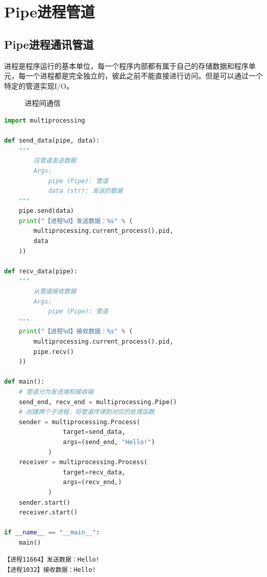 \newpage

\section{Pipe进程管道}

\subsection{Pipe进程通讯管道}

进程是程序运行的基本单位，每一个程序内部都有属于自己的存储数据和程序单元，每一个进程都是完全独立的，彼此之前不能直接进行访问。但是可以通过一个特定的管道实现I/O。

\begin{figure}[H]
	\centering
	\caption{进程间通信}
\end{figure}


\begin{lstlisting}[language=Python]
import multiprocessing

def send_data(pipe, data):
	"""
		往管道发送数据
		Args:
			pipe (Pipe): 管道
			data (str): 发送的数据
	"""
	pipe.send(data)
	print("【进程%d】发送数据：%s" % (
		multiprocessing.current_process().pid,
		data
	))

def recv_data(pipe):
	"""
		从管道接收数据
		Args:
			pipe (Pipe): 管道
	"""
	print("【进程%d】接收数据：%s" % (
		multiprocessing.current_process().pid, 
		pipe.recv()
	))

def main():
	# 管道分为发送端和接收端
	send_end, recv_end = multiprocessing.Pipe()
	# 创建两个子进程，将管道传递到对应的处理函数
	sender = multiprocessing.Process(
				target=send_data,
				args=(send_end, "Hello!")
			)
	receiver = multiprocessing.Process(
				target=recv_data,
				args=(recv_end,)
			)
	sender.start()
	receiver.start()

if __name__ == "__main__":
	main()
\end{lstlisting}

\begin{tcolorbox}
	\begin{verbatim}
【进程11664】发送数据：Hello!
【进程1032】接收数据：Hello!
\end{verbatim}
\end{tcolorbox}

